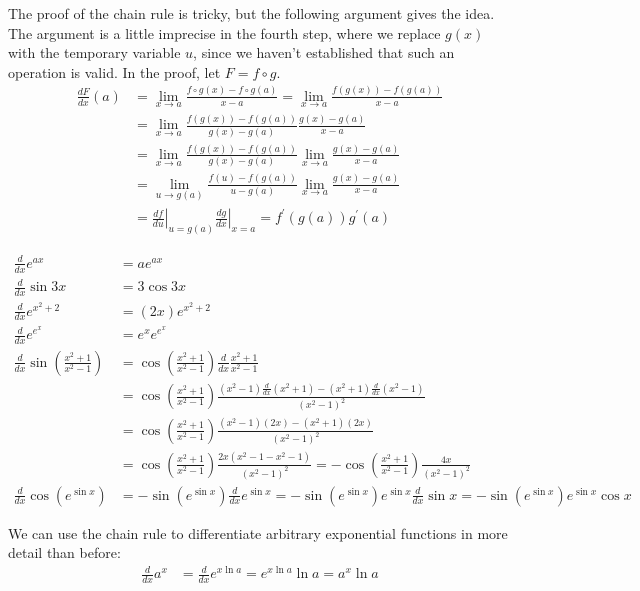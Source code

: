 \documentclass[fleqn]{report}
\begin{document}
The proof of the chain rule is tricky, but the following
argument gives the idea. The argument is a little imprecise
in the fourth step, where we replace $g(x)$ with the temporary
variable $u$, since we haven't established that such an
operation is valid. In the proof, let $F = f \circ g$.
\begin{align*}
\frac{dF}{dx}(a) & = \lim_{x \rightarrow a} \frac{f \circ g (x)
- f \circ g(a)}{x-a} = \lim_{x \rightarrow a} \frac{f(g(x)) -
 f(g(a))}{x-a} \\
& = \lim_{x \rightarrow a} \frac{f(g(x)) - f(g(a))}{g(x) - g(a)}
\frac{g(x) - g(a)}{x-a}\\
& = \lim_{x \rightarrow a} \frac{f(g(x)) - f(g(a))}{g(x) - g(a)}
\lim_{x \rightarrow a} \frac{g(x) - g(a)}{x-a} \\
& = \lim_{u \rightarrow g(a)} \frac{f(u) - f(g(a))}{u - g(a)}
\lim_{x \rightarrow a} \frac{g(x) - g(a)}{x-a} \\
& = \left. \frac{df}{du} \right|_{u=g(a)} \left.
\frac{dg}{dx} \right|_{x=a} = f^\prime(g(a)) g^\prime(a)
\end{align*}

\begin{example}
\begin{align*}
\frac{d}{dx} e^{ax} & = ae^{ax} \\
\frac{d}{dx} \sin 3x & = 3 \cos 3x \\
\frac{d}{dx} e^{x^2+2} & = (2x) e^{x^2+2} \\
\frac{d}{dx} e^{e^x} & = e^x e^{e^x} \\
\frac{d}{dx} \sin \left( \frac{x^2+1}{x^2-1} \right) & = \cos
\left( \frac{x^2+1}{x^2-1} \right) \frac{d}{dx}
\frac{x^2+1}{x^2-1} \\
& = \cos \left( \frac{x^2+1}{x^2-1} \right) \frac{(x^2-1)
\frac{d}{dx} (x^2+1) - (x^2+1) \frac{d}{dx} (x^2-1)}{(x^2-1)^2} \\
& = \cos \left( \frac{x^2+1}{x^2-1} \right) \frac{(x^2-1)
(2x) - (x^2+1) (2x)}{(x^2-1)^2} \\
& = \cos \left( \frac{x^2+1}{x^2-1} \right) \frac{2x(x^2-1 - x^2
-1)}{(x^2-1)^2} = - \cos \left( \frac{x^2+1}{x^2-1} \right) 
\frac{4x}{(x^2-1)^2} \\
\frac{d}{dx} \cos ( e^{\sin x}) & = -\sin (e^{\sin x})
\frac{d}{dx} e^{\sin x} = -\sin (e^{\sin x}) e^{\sin x}
\frac{d}{dx} \sin x = -\sin (e^{\sin x}) e^{\sin x} \cos x 
\end{align*}
\end{example}

\begin{example}
We can use the chain rule to differentiate
arbitrary exponential functions in more detail than before:
\begin{align*}
\frac{d}{dx} a^x& = \frac{d}{dx} e^{x\ln a} = e^{x \ln a} \ln a =
a^x \ln a 
\end{align*}
\end{example}
\end{document}
